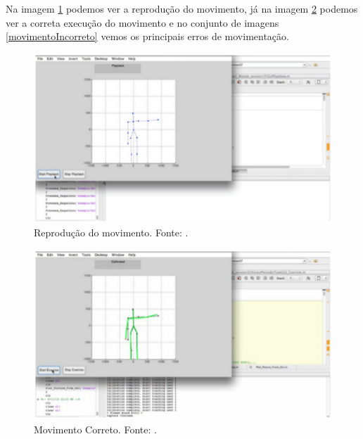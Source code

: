 Na imagem \ref{movimentoReproducao} podemos ver a reprodução do movimento, já na
imagem \ref{movimentoCorreto} podemos ver a correta execução do movimento e no
conjunto de imagens \ref{movimentoIncorreto} vemos os principais erros de movimentação.

\begin{figure}[H]
\centering
\includegraphics [keepaspectratio=true,scale=0.60]{figuras/movimentoReproducao.eps}

\caption{Reprodução do movimento. Fonte: \cite{roberto}.}

\label{movimentoReproducao}
\end{figure}

\begin{figure}[H]
\centering
\includegraphics [keepaspectratio=true,scale=0.60]{figuras/movimentoCorreto.eps}

\caption{Movimento Correto. Fonte: \cite{roberto}.}
\label{movimentoCorreto}
\end{figure}

